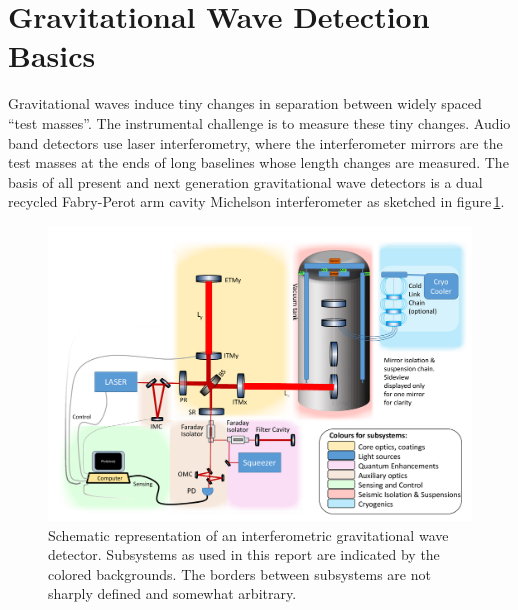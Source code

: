 \section{Gravitational Wave Detection Basics}
Gravitational waves induce tiny changes in separation between widely spaced “test masses”. The instrumental challenge is to measure these tiny changes. Audio band detectors use laser interferometry, where the interferometer mirrors are the test masses at the ends of long baselines whose length changes are measured. The basis of all present and next generation gravitational wave detectors is a dual recycled Fabry-Perot arm cavity Michelson interferometer as sketched in figure\,\ref{fig:ifo_layout}. 
\begin{figure}[ht]
\includegraphics*[width=\textwidth]{Figures/InterferometerSchematicSubsystemColourSAS.pdf}
\caption{Schematic representation of an interferometric gravitational wave detector. Subsystems as used in this report are indicated by the colored backgrounds. The borders between subsystems are not sharply defined and somewhat arbitrary.}
\label{fig:ifo_layout}
\end{figure}

